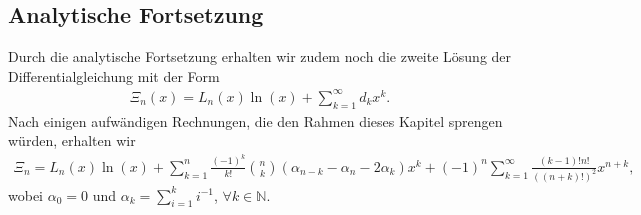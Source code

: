 \subsection{Analytische Fortsetzung}
Durch die analytische Fortsetzung erhalten wir zudem noch die zweite Lösung der
Differentialgleichung mit der Form
\begin{align*}
\Xi_n(x)
=
L_n(x) \ln(x) + \sum_{k=1}^\infty d_k x^k
.
\end{align*}
Nach einigen aufwändigen Rechnungen, 
die den Rahmen dieses Kapitel sprengen würden,
erhalten wir
\begin{align*}
\Xi_n
=
L_n(x) \ln(x)
+
\sum_{k=1}^n \frac{(-1)^k}{k!} \binom{n}{k}
(\alpha_{n-k} - \alpha_n - 2 \alpha_k)x^k
+
(-1)^n \sum_{k=1}^\infty \frac{(k-1)!n!}{((n+k)!)^2} x^{n+k},
\end{align*}
wobei $\alpha_0 = 0$ und $\alpha_k =\sum_{i=1}^k i^{-1}$,
$\forall k \in \mathbb{N}$.
